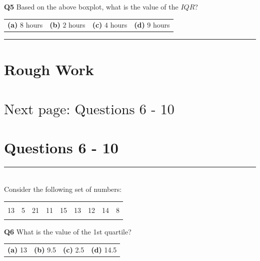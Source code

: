 \documentclass[12pt]{article}
\begin{document}
{\bf Q5} Based on the above boxplot, what is the value of the $IQR$?\\[0.2cm]
\begin{tabular}{cccc}
{\bf(a)} $8$ hours & {\bf(b)} $2$ hours & {\bf(c)} $4$ hours & {\bf(d)} $9$ hours \\[0.6cm]
\end{tabular}



\rule{\linewidth}{1pt}

\newpage

\section*{Rough Work\\[23cm]}
\section*{\hspace{8cm}$\boxed{\text{Next page: Questions 6 - 10}}$}

\newpage


\section*{Questions 6 - 10}

\rule{\linewidth}{1pt}
\quad\\
Consider the following set of numbers:
\begin{center}
\begin{tabular}{|ccccccccc|}
\hline
&&&&&&&&\\[-0.4cm]
13 & 5 & 21 & 11 & 15 & 13 & 12 & 14 & 8 \\
\hline
\multicolumn{9}{c}{}
\end{tabular}
\end{center}

{\bf Q6} What is the value of the 1st quartile?\\[0.2cm]
\begin{tabular}{cccc}
{\bf(a)} 13 & {\bf(b)} 9.5 & {\bf(c)} 2.5 & {\bf(d)} 14.5 \\[0.6cm]
\end{tabular}
\end{document}
